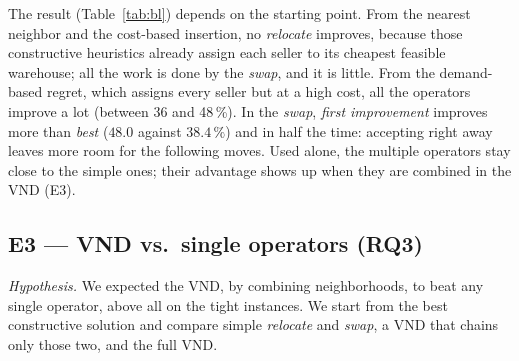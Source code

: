 \documentclass[11pt,a4paper]{article}
\begin{document}
\begin{table}[ht]
\centering
\caption{E2: improvement (\%) over the cost of the constructive solution depending on which one it
starts from, largest improvement, mean time and mean number of passes (these three over all the
runs). The \emph{multiple} operators apply a fixed strategy ($q{=}1\dots10$), with no first/best
variant.}
\label{tab:bl}
\small
{}
\end{table}

The result (Table~\ref{tab:bl}) depends on the starting point. From the nearest neighbor and the
cost-based insertion, no \emph{relocate} improves, because those constructive heuristics already
assign each seller to its cheapest feasible warehouse; all the work is done by the \emph{swap}, and
it is little. From the demand-based regret, which assigns every seller but at a high cost, all the
operators improve a lot (between 36 and 48\,\%). In the \emph{swap}, \emph{first improvement}
improves more than \emph{best} ($48.0$ against $38.4\,\%$) and in half the time: accepting right
away leaves more room for the following moves. Used alone, the multiple operators stay close to the
simple ones; their advantage shows up when they are combined in the VND (E3).

\subsection{E3 --- VND vs.\ single operators (RQ3)}
\emph{Hypothesis.} We expected the VND, by combining neighborhoods, to beat any single operator,
above all on the tight instances. We start from the best constructive solution and compare simple
\emph{relocate} and \emph{swap}, a VND that chains only those two, and the full VND.
\end{document}
